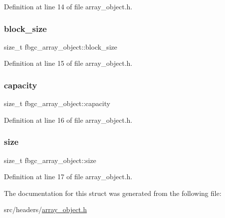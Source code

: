 Definition at line 14 of file array\+\_\+object.\+h.

\mbox{\label{structfbgc__array__object_a024fd5a28429dcd8df1b67ff92187a4c}} 
\subsubsection{\texorpdfstring{block\+\_\+size}{block\_size}}
{\footnotesize\ttfamily size\+\_\+t fbgc\+\_\+array\+\_\+object\+::block\+\_\+size}



Definition at line 15 of file array\+\_\+object.\+h.

\mbox{\label{structfbgc__array__object_aa90d801bf3a8c5424d819aa127a76476}} 
\subsubsection{\texorpdfstring{capacity}{capacity}}
{\footnotesize\ttfamily size\+\_\+t fbgc\+\_\+array\+\_\+object\+::capacity}



Definition at line 16 of file array\+\_\+object.\+h.

\mbox{\label{structfbgc__array__object_a9cfe79f57b1a314ca1d3f2a509fe1afe}} 
\subsubsection{\texorpdfstring{size}{size}}
{\footnotesize\ttfamily size\+\_\+t fbgc\+\_\+array\+\_\+object\+::size}



Definition at line 17 of file array\+\_\+object.\+h.



The documentation for this struct was generated from the following file\+:\begin{DoxyCompactItemize}
\item 
src/headers/\hyperlink{array__object_8h}{array\+\_\+object.\+h}\end{DoxyCompactItemize}
